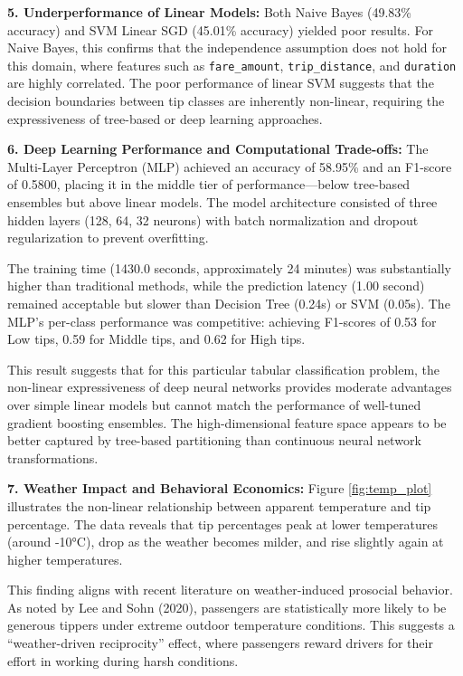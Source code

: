 \documentclass[11pt]{article}
\begin{document}
\textbf{5. Underperformance of Linear Models:}
Both Naive Bayes (49.83\% accuracy) and SVM Linear SGD (45.01\% accuracy) yielded poor results. For Naive Bayes, this confirms that the independence assumption does not hold for this domain, where features such as \texttt{fare\_amount}, \texttt{trip\_distance}, and \texttt{duration} are highly correlated. The poor performance of linear SVM suggests that the decision boundaries between tip classes are inherently non-linear, requiring the expressiveness of tree-based or deep learning approaches.

\textbf{6. Deep Learning Performance and Computational Trade-offs:}
The Multi-Layer Perceptron (MLP) achieved an accuracy of 58.95\% and an F1-score of 0.5800, placing it in the middle tier of performance—below tree-based ensembles but above linear models. The model architecture consisted of three hidden layers (128, 64, 32 neurons) with batch normalization and dropout regularization to prevent overfitting.

The training time (1430.0 seconds, approximately 24 minutes) was substantially higher than traditional methods, while the prediction latency (1.00 second) remained acceptable but slower than Decision Tree (0.24s) or SVM (0.05s). The MLP's per-class performance was competitive: achieving F1-scores of 0.53 for Low tips, 0.59 for Middle tips, and 0.62 for High tips.

This result suggests that for this particular tabular classification problem, the non-linear expressiveness of deep neural networks provides moderate advantages over simple linear models but cannot match the performance of well-tuned gradient boosting ensembles. The high-dimensional feature space appears to be better captured by tree-based partitioning than continuous neural network transformations.

\textbf{7. Weather Impact and Behavioral Economics:}
Figure \ref{fig:temp_plot} illustrates the non-linear relationship between apparent temperature and tip percentage. The data reveals that tip percentages peak at lower temperatures (around -10°C), drop as the weather becomes milder, and rise slightly again at higher temperatures.

This finding aligns with recent literature on weather-induced prosocial behavior. As noted by Lee and Sohn (2020), passengers are statistically more likely to be generous tippers under extreme outdoor temperature conditions. This suggests a ``weather-driven reciprocity'' effect, where passengers reward drivers for their effort in working during harsh conditions.
\end{document}
